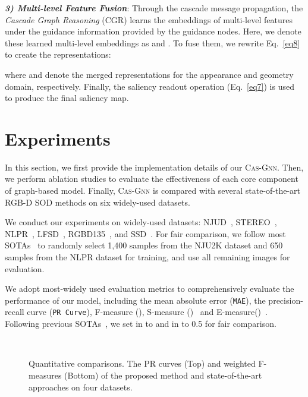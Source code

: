 \documentclass[runningheads]{llncs}
\begin{document}
\noindent \emph{\textbf{\footnotesize 3) Multi-level Feature Fusion}}: Through the cascade message propagation, the {\em Cascade Graph Reasoning} (CGR) learns the embeddings of multi-level features under the guidance information provided by the guidance nodes. Here, we denote these learned multi-level embeddings as  and . To fuse them, we rewrite Eq.~\ref{eq8} to create the representations:


\noindent where  and  denote the merged representations for the appearance and geometry domain, respectively. Finally, the saliency readout operation (Eq.~\ref{eq7}) is used to produce the final saliency map.

\section{ Experiments}
In this section, we first provide the implementation details of our {\scshape{Cas-Gnn}}. Then, we perform ablation studies to evaluate the effectiveness of each core component of graph-based model. Finally, {\scshape{Cas-Gnn}} is compared with several state-of-the-art RGB-D SOD methods on six widely-used datasets.  

 We conduct our experiments on  widely-used datasets: NJUD~\cite{ju2014depth}, STEREO~\cite{niu2012leveraging}, NLPR~\cite{peng2014rgbd},  LFSD~\cite{li2014saliency}, RGBD135~\cite{cheng2014depth}, and SSD~\cite{zhu2017three}. For fair comparison, we follow most SOTAs~\cite{Chen_2018_CVPR,chen2019multi,han2017cnns} to randomly select 1,400 samples from the NJU2K dataset and 650 samples from the NLPR dataset for training, and use all remaining images for evaluation. 

 We adopt  most-widely used evaluation metrics to comprehensively evaluate the performance of our model, including the mean absolute error ({\tt MAE}), the precision-recall curve ({\tt PR Curve}), F-measure (), S-measure ()~\cite{fan2017structure} and E-measure()~\cite{fan2018enhanced}. Following previous SOTAs~\cite{Chen_2018_CVPR,chen2019multi,han2017cnns}, we set  in  to  and  in  to 0.5 for fair comparison.

\begin{figure}[pt]
	\begin{center}
		\\
		\setcounter{subfigure}{0}
	\end{center}
	\caption{Quantitative comparisons. The PR curves (Top) and weighted F-measures (Bottom) of the proposed method and state-of-the-art approaches on four datasets.}
	\label{fig:sub}
\end{figure}
\end{document}
